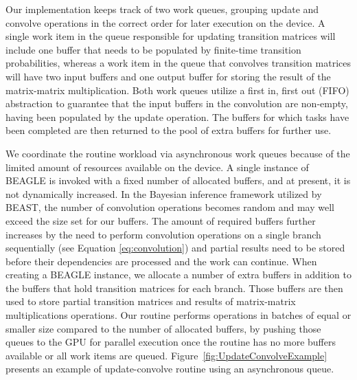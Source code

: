 Our implementation keeps track of two work queues, grouping update and convolve operations in the correct order for later execution on the device. 
A single work item in the queue responsible for updating transition matrices will include one buffer that needs to be populated by finite-time transition probabilities, whereas a work item in the queue that convolves transition matrices will have two input buffers and one output buffer for storing the result of the matrix-matrix multiplication. 
Both work queues utilize a first in, first out (FIFO) abstraction 
to guarantee that the input buffers in the convolution are non-empty, having  been populated by the update operation. 
The buffers for which tasks have been completed are then returned to the pool of extra buffers for further use.

We coordinate the routine workload via asynchronous work queues because of the limited amount of resources available on the device. A single instance of BEAGLE is invoked with a fixed number of allocated buffers, and at present, it is not dynamically increased.
In the Bayesian inference framework utilized by BEAST, the number of convolution operations becomes random and may well exceed the size set for our buffers.
The amount of required buffers further increases by the need to perform convolution operations on a single branch sequentially  
(see Equation \ref{eq:convolution}) and partial results need to be stored before their dependencies are processed and the work can continue. 
When creating a BEAGLE instance, we allocate a number of extra buffers in addition to the buffers that hold transition matrices for each branch. 
Those buffers are then used to store partial transition matrices and results of matrix-matrix multiplications operations. 
Our routine performs operations in batches of equal or smaller size compared to the number of allocated buffers, by pushing those queues to the GPU for parallel execution once the routine has no more buffers available or all work items are queued. Figure~\ref{fig:UpdateConvolveExample} presents an example of update-convolve routine using an asynchronous queue. 

